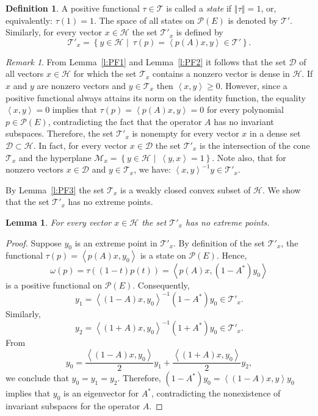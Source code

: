 \documentclass{tran-l}
\newtheorem{lem}[thm]{Lemma}
\theoremstyle{definition}
\newtheorem{defn}[thm]{Definition}
\theoremstyle{remark}
\newtheorem{rem}[thm]{Remark}
\numberwithin{equation}{subsection}
\newcommand{\h}{\mathcal{H}}
\newcommand{\M}{\mathcal{M}}
\newcommand{\Poly}{\mathcal{P}(E)}
\newcommand{\EssD}{\mathcal{D}}
\newcommand{\States}{\mathcal{T}}
\newcommand{\set}[1]{\left\{#1\right\}}
\newcommand{\seq}[1]{\left<#1\right>}
\newcommand{\norm}[1]{\left\Vert#1\right\Vert}
\begin{document}
\begin{defn}
A positive functional $\tau\in\States$ is called a \emph{state} if $\norm{\tau}=1$, or, equivalently: $\tau(1)=1$. The space of all states on $\Poly$ is denoted by $\States'$. Similarly, for every vector $x\in\h$ the set $\States'_x$ is defined by
\[ \States'_x = \set{y\in\h\,\,|\,\,\, \tau(p) =
                \seq{p(A)x,y} \in \States'}. \]
\end{defn}

\begin{rem}
From Lemma~\ref{l:PF1} and Lemma~\ref{l:PF2} it follows that the set $\EssD$ of all vectors $x\in\h$ for which the set $\States_x$ contains a nonzero vector is dense in $\h$. If $x$ and $y$ are nonzero vectors and $y\in\States_x$ then $\seq{x,y}\geq0$. However, since a positive functional always attains its norm on the identity function, the equality $\seq{x,y}=0$ implies that $\tau(p)=\seq{p(A)x,y}=0$ for every polynomial $p\in\Poly$, contradicting the fact that the operator $A$ has no invariant subspaces. Therefore, the set $\States'_x$ is nonempty for every vector $x$ in a dense set $\EssD\subset\h$. In fact, for every vector $x\in\EssD$ the set $\States'_x$ is the intersection of the cone $\States_x$ and the hyperplane $\M_x=\set{y\in\h\,\,|\,\,\,\seq{y,x}=1}$. Note also, that for nonzero vectors $x\in\EssD$ and $y\in\States_x$, we have: $\seq{x,y}^{-1}y\in\States'_x$.
\end{rem}

By Lemma~\ref{l:PF3} the set $\States_x$ is a weakly closed convex subset of $\h$. We show that the set $\States'_x$ has no extreme points.

\begin{lem} \label{l:EXTR}
For every vector $x\in\h$ the set $\States'_x$ has no extreme points.
\end{lem}

\begin{proof}
Suppose $y_0$ is an extreme point in $\States'_x$. By definition of the set $\States'_x$, the functional $\tau(p)=\seq{p(A)x,y_0}$ is a state on $\Poly$. Hence,
\[ \omega(p)=\tau((1-t)p(t))=\seq{p(A)x, (1-A^*)y_0} \]
is a positive functional on $\Poly$. Consequently,
\[ y_1 = \seq{(1-A)x, y_0}^{-1}(1-A^*)y_0 \in \States'_x. \]
Similarly,
\[ y_2 = \seq{(1+A)x, y_0}^{-1}(1+A^*)y_0 \in \States'_x. \]
From
\[ y_0 = \frac{\seq{(1-A)x, y_0}}{2}
   y_1 + \frac{\seq{(1+A)x, y_0}}{2} y_2, \]
we conclude that $y_0=y_1=y_2$. Therefore, $(1-A^*)y_0=\seq{(1-A)x,y}y_0$ implies that $y_0$ is an eigenvector for $A^*$, contradicting the nonexistence of invariant subspaces for the operator $A$.
\end{proof}
\end{document}
